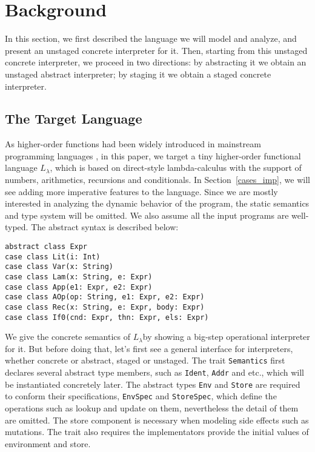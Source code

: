 \newcommand{\TLang}{$L_\lambda$}

\section{Background}

In this section, we first described the language we will model and analyze, and present an unstaged concrete 
interpreter for it. Then, starting from this unstaged concrete interpreter, we proceed in two directions:
by abstracting it we obtain an unstaged abstract interpreter; by staging it we obtain a staged concrete
interpreter.

\subsection{The Target Language} \label{bg_lang}

As higher-order functions had been widely introduced in mainstream programming languages , in this paper, 
we target a tiny higher-order functional language \TLang, which is based on direct-style lambda-calculus
with the support of numbers, arithmetics, recursions and conditionals.
In Section~\ref{cases_imp}, we will see adding more imperative features to the language.
Since we are mostly interested in analyzing the dynamic behavior of the program, the static semantics and
type system will be omitted. We also assume all the input programs are well-typed.
The abstract syntax is described below:

\begin{lstlisting}
abstract class Expr
case class Lit(i: Int)
case class Var(x: String)
case class Lam(x: String, e: Expr)
case class App(e1: Expr, e2: Expr)
case class AOp(op: String, e1: Expr, e2: Expr)
case class Rec(x: String, e: Expr, body: Expr)
case class If0(cnd: Expr, thn: Expr, els: Expr)
\end{lstlisting}

We give the concrete semantics of \TLang by showing a big-step operational interpreter for it.
But before doing that, let's first see a general interface for interpreters, whether concrete or abstract, 
staged or unstaged. The trait \texttt{Semantics} first declares several abstract type members, such as \texttt{Ident},
\texttt{Addr} and etc., which will be instantiated concretely later. The abstract types \texttt{Env} and \texttt{Store}
are required to conform their specifications, \texttt{EnvSpec} and \texttt{StoreSpec}, which define 
the operations such as lookup and update on them, nevertheless the detail of them are omitted.  
The store component is necessary when modeling side effects such as mutations. 
The trait also requires the implementators provide the initial values of environment and store.

